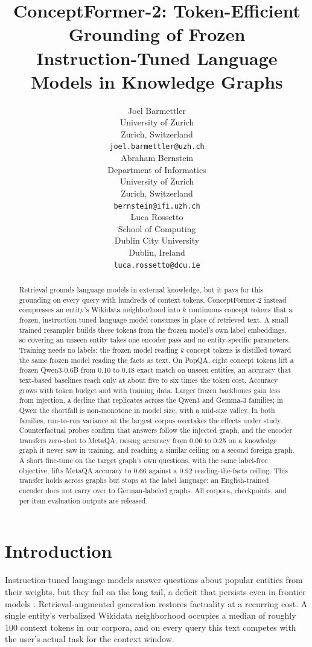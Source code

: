 \documentclass{article}
\title{ConceptFormer-2: Token-Efficient Grounding of Frozen\\
  Instruction-Tuned Language Models in Knowledge Graphs}
\author{%
  Joel Barmettler\\
  University of Zurich\\
  Zurich, Switzerland\\
  \texttt{joel.barmettler@uzh.ch}\\
  \And
  Abraham Bernstein\\
  Department of Informatics\\
  University of Zurich\\
  Zurich, Switzerland\\
  \texttt{bernstein@ifi.uzh.ch}\\
  \And
  Luca Rossetto\\
  School of Computing\\
  Dublin City University\\
  Dublin, Ireland\\
  \texttt{luca.rossetto@dcu.ie}\\
}
\newcommand{\popqa}{PopQA}
\begin{document}
\maketitle

\begin{abstract}
  Retrieval grounds language models in external knowledge, but it pays for this grounding on
  every query with hundreds of context tokens. ConceptFormer-2 instead compresses an entity's
  Wikidata neighborhood into $k$ continuous concept tokens that a frozen, instruction-tuned
  language model consumes in place of retrieved text. A small trained resampler builds these tokens
  from the frozen model's own label embeddings, so covering an unseen entity takes one encoder
  pass and no entity-specific parameters. Training needs no labels: the frozen model reading $k$ concept tokens
  is distilled toward the same frozen model reading the facts as text. On \popqa{}, eight
  concept tokens lift a frozen Qwen3-0.6B from 0.10 to 0.48 exact match on unseen entities,
  an accuracy that text-based baselines reach only at about five to six times the token cost.
  Accuracy grows with token budget and with training data. Larger frozen backbones gain less
  from injection, a decline that replicates across the Qwen3 and Gemma-3 families; in Qwen the
  shortfall is non-monotone in model size, with a mid-size valley. In both families, run-to-run
  variance at the largest corpus overtakes the effects under study. Counterfactual probes confirm
  that answers follow the injected graph, and the encoder transfers zero-shot to MetaQA,
  raising accuracy from 0.06 to 0.25 on a knowledge graph it never saw in training, and
  reaching a similar ceiling on a second foreign graph. A short fine-tune on the target
  graph's own questions, with the same label-free objective, lifts MetaQA accuracy to 0.66
  against a 0.92 reading-the-facts ceiling. This transfer holds across graphs but
  stops at the label language: an English-trained encoder does not carry over to
  German-labeled graphs. All corpora, checkpoints, and per-item
  evaluation outputs are released.
\end{abstract}

\section{Introduction}

Instruction-tuned language models answer questions about popular entities from their weights,
but they fail on the long tail, a deficit that persists even in frontier models
\citep{emptyshelves,headtotail}. Retrieval-augmented generation \citep{rag} restores
factuality at a recurring cost. A single entity's verbalized Wikidata neighborhood occupies a
median of roughly 100 context tokens in our corpora, and on every query this text competes
with the user's actual task for the context window.
\end{document}
